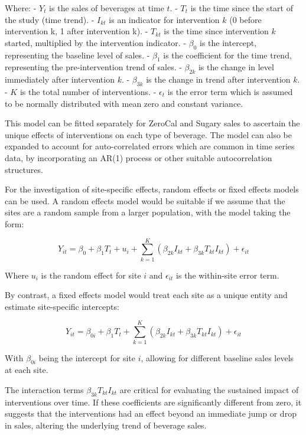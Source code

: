 \documentclass[
]{article}
\begin{document}
Where: - \(Y_t\) is the sales of beverages at time \(t\). - \(T_t\) is
the time since the start of the study (time trend). - \(I_{kt}\) is an
indicator for intervention \(k\) (0 before intervention k, 1 after
intervention k). - \(T_{kt}\) is the time since intervention \(k\)
started, multiplied by the intervention indicator. - \(\beta_0\) is the
intercept, representing the baseline level of sales. - \(\beta_1\) is
the coefficient for the time trend, representing the pre-intervention
trend of sales. - \(\beta_{2k}\) is the change in level immediately
after intervention \(k\). - \(\beta_{3k}\) is the change in trend after
intervention \(k\). - \(K\) is the total number of interventions. -
\(\epsilon_t\) is the error term which is assumed to be normally
distributed with mean zero and constant variance.

This model can be fitted separately for ZeroCal and Sugary sales to
ascertain the unique effects of interventions on each type of beverage.
The model can also be expanded to account for auto-correlated errors
which are common in time series data, by incorporating an AR(1) process
or other suitable autocorrelation structures.

For the investigation of site-specific effects, random effects or fixed
effects models can be used. A random effects model would be suitable if
we assume that the sites are a random sample from a larger population,
with the model taking the form:

\[Y_{it} = \beta_0 + \beta_1 T_t + u_i + \sum_{k=1}^{K} (\beta_{2k} I_{kt} + \beta_{3k} T_{kt} I_{kt}) + \epsilon_{it} \]

Where \(u_i\) is the random effect for site \(i\) and \(\epsilon_{it}\)
is the within-site error term.

By contrast, a fixed effects model would treat each site as a unique
entity and estimate site-specific intercepts:

\[Y_{it} = \beta_{0i} + \beta_1 T_t + \sum_{k=1}^{K} (\beta_{2k} I_{kt} + \beta_{3k} T_{kt} I_{kt}) + \epsilon_{it} \]

With \(\beta_{0i}\) being the intercept for site \(i\), allowing for
different baseline sales levels at each site.

The interaction terms \(\beta_{3k} T_{kt} I_{kt}\) are critical for
evaluating the sustained impact of interventions over time. If these
coefficients are significantly different from zero, it suggests that the
interventions had an effect beyond an immediate jump or drop in sales,
altering the underlying trend of beverage sales.
\end{document}
